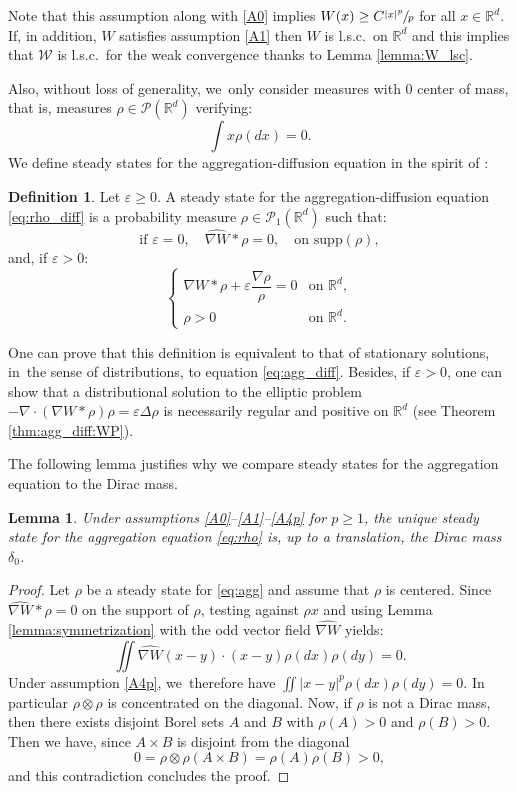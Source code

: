 \documentclass[JEP,XML,SOM,Unicode, NoFloatCountersInSection,published]{cedram}
\def\RR{\mathbb{R}}
\def\eps{\varepsilon}
\def\calP{{\mathcal P}}
\def\calW{{\mathcal W}}
\def\nabWchapo{\widehat{\nabla W}}
\theoremstyle{plain}
\newtheorem{lemma}[theorem]{Lemma}
\theoremstyle{definition}
\newtheorem{defi}[theorem]{Definition}
\begin{document}
Note that this assumption along with \eqref{A0} implies $W(x) \geq C \sfrac{|x|^p}{p}$ for all $x \in \RR^d$. If, in addition, $W$ satisfies assumption \eqref{A1} then $W$ is l.s.c.\ on $\RR^d$ and this implies that $\calW$ is l.s.c.\ for the weak convergence thanks to Lemma \ref{lemma:W_lsc}.

Also, without loss of generality, we~only consider measures with 0 center of mass, that is, measures $\rho \in \calP(\RR^d)$ verifying:
\[
\int x\rho (dx) = 0.
\]
We define steady states for the aggregation-diffusion equation in the spirit of \cite{kang19}:
\begin{defi}
Let $\eps \geq 0$. A steady state for the aggregation-diffusion equation \eqref{eq:rho_diff} is a probability measure $\rho \in \calP_1(\RR^d)$ such that:
\[
\text{if } \eps = 0, \quad \nabWchapo * \rho = 0, \quad \text{on } \mathrm{supp}(\rho),
\]
and, if $\eps > 0$:
\[
\begin{cases}
\nabla W * \rho + \eps \dfrac{\nabla \rho}{\rho} = 0 &\text{on } \RR^d,\\
\rho > 0&\text{on } \RR^d.
\end{cases}
\]
\end{defi}
One can prove that this definition is equivalent to that of stationary solutions, in~the sense of distributions, to equation \eqref{eq:agg_diff}. Besides, if $\eps > 0$, one can show that a distributional solution to the elliptic problem $- \nabla \cdot (\nabla W * \rho) \rho = \eps \Delta \rho$ is necessarily regular and positive on $\RR^d$ (see Theorem \ref{thm:agg_diff:WP}).

The following lemma justifies why we compare steady states for the aggregation equation to the Dirac mass.
\begin{lemma}
Under assumptions \eqref{A0}--\eqref{A1}--\eqref{A4p} for $p \geq 1$, the unique steady state for the aggregation equation \eqref{eq:rho} is, up to a translation, the Dirac mass $\delta_0$.
\end{lemma}

\begin{proof}
Let $\rho$ be a steady state for \eqref{eq:agg} and assume that $\rho$ is centered. Since $\nabWchapo * \rho = 0$ on the support of $\rho$, testing against $\rho x$ and using Lemma \ref{lemma:symmetrization} with the odd vector field $\nabWchapo$ yields:
\[
\iint \nabWchapo(x-y) \cdot (x-y) \rho(dx) \rho(dy) = 0.
\]
Under assumption \eqref{A4p}, we~therefore have $\iint |x-y|^p \rho(dx) \rho(dy) = 0$. In particular $\rho\otimes\rho$ is concentrated on the diagonal. Now, if $\rho$ is not a Dirac mass, then there exists disjoint Borel sets $A$ and $B$ with $\rho(A)>0$ and $\rho(B)>0$. Then we have, since $A\times B$ is disjoint from the diagonal
\[
0 =\rho \otimes \rho(A \times B) =\rho(A)\rho(B)> 0,
\]
and this contradiction concludes the proof.
\end{proof}
\end{document}
